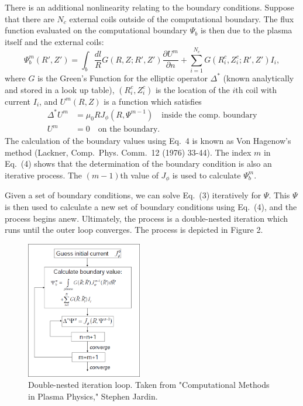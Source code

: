 \documentclass[paper=letter, fontsize=11pt]{scrartcl} %
\begin{document}
There is an additional nonlinearity relating to the boundary conditions.  Suppose that there are $N_c$ external coils outside of the computational boundary.  The flux function evaluated on the computational boundary $\Psi_b$ is then due to the plasma itself and the external coils:
\begin{equation}
\Psi^m_b (R',Z') = \int_{b} \frac{dl}{R} G(R,Z; R',Z') \frac{\partial U^m}{\partial n} + \sum_{i=1}^{N_c} G(R_i^c,Z_i^c; R',Z') I_i,
\end{equation}
where $G$ is the Green's Function for the elliptic operator $\Delta^{*}$ (known analytically and stored in a look up table), $(R_i^c,Z_i^c)$ is the location of the $i$th coil with current $I_i$, and $U^m(R,Z)$ is a function which satisfies
\begin{align}
\Delta^{*} U^m &= \mu_0 R J_\phi (R, \Psi^{m-1}) \quad \mbox{inside the comp.~boundary} \\
U^m &= 0 \quad \mbox{on the boundary}.
\end{align}
The calculation of the boundary values using Eq.~4 is known as Von Hagenow's method (Lackner, Comp.~Phys. Comm.~12 (1976) 33-44).
The index $m$ in Eq.~(4) shows that the determination of the boundary condition is also an iterative process.  The $(m-1)$th value of $J_\phi$ is used to calculate $\Psi_b^m$.  

Given a set of boundary conditions, we can solve Eq.~(3) iteratively for $\Psi$.  This $\Psi$ is then used to calculate a new set of boundary conditions using Eq.~(4), and the process begins anew.  Ultimately, the process is a double-nested iteration which runs until the outer loop converges.  The process is depicted in Figure 2.

\begin{figure}
\centering
\captionsetup{justification=centering,margin=3cm}
\caption[caption]{Double-nested iteration loop. Taken from "Computational Methods in Plasma Physics," Stephen Jardin.}
\includegraphics[width=0.45\textwidth]{algorithm}
\end{figure}
\end{document}
